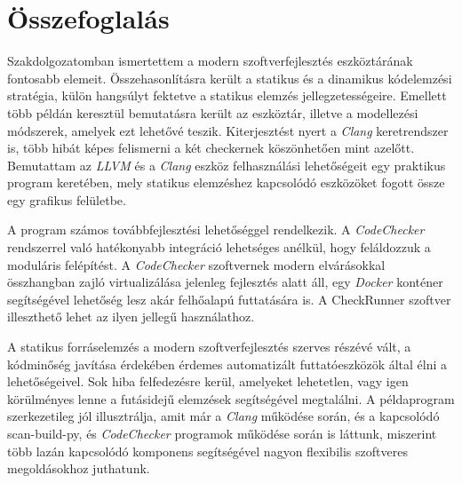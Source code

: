 \documentclass[a4paper,12pt]{report}
\begin{document}
\chapter{Összefoglalás}
Szakdolgozatomban ismertettem a modern szoftverfejlesztés eszköztárának fontosabb elemeit. Összehasonlításra került a statikus és a dinamikus kódelemzési stratégia, külön hangsúlyt fektetve a statikus elemzés jellegzetességeire. Emellett több példán keresztül bemutatásra került az eszköztár, illetve a modellezési módszerek, amelyek ezt lehetővé teszik. Kiterjesztést nyert a \emph{Clang} keretrendszer is, több hibát képes felismerni a két checkernek köszönhetően mint azelőtt. Bemutattam az \emph{LLVM} és a \emph{Clang} eszköz felhasználási lehetőségeit egy praktikus program keretében, mely statikus elemzéshez kapcsolódó eszközöket fogott össze egy grafikus felületbe.

A program számos továbbfejlesztési lehetőséggel rendelkezik. A \emph{CodeChecker} rendszerrel való hatékonyabb integráció lehetséges anélkül, hogy feláldozzuk a moduláris felépítést. A \emph{CodeChecker} szoftvernek modern elvárásokkal összhangban zajló virtualizálása jelenleg fejlesztés alatt áll, egy \emph{Docker} konténer segítségével lehetőség lesz akár felhőalapú futtatására is. A CheckRunner szoftver illeszthető lehet az ilyen jellegű használathoz.

A statikus forráselemzés a modern szoftverfejlesztés szerves részévé vált, a kódminőség javítása érdekében érdemes automatizált futtatóeszközök által élni a lehetőségeivel. Sok hiba felfedezésre kerül, amelyeket lehetetlen, vagy igen körülményes lenne a futásidejű elemzések segítségével megtalálni. A példaprogram szerkezetileg jól illusztrálja, amit már a \emph{Clang} működése során, és a kapcsolódó scan-build-py, és \emph{CodeChecker} programok működése során is láttunk, miszerint több lazán kapcsolódó komponens segítségével nagyon flexibilis szoftveres megoldásokhoz juthatunk.
\end{document}
